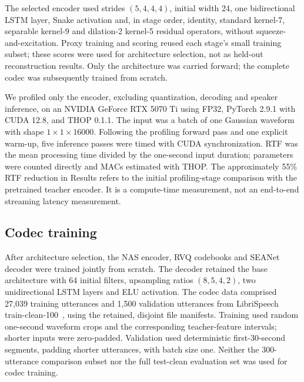 \documentclass[final,5p,times,twocolumn]{elsarticle}
\begin{document}
The selected encoder used strides $(5,4,4,4)$, initial width 24, one bidirectional LSTM layer, Snake activation and, in stage order, identity, standard kernel-7, separable kernel-9 and dilation-2 kernel-5 residual operators, without squeeze-and-excitation. Proxy training and scoring reused each stage's small training subset; these scores were used for architecture selection, not as held-out reconstruction results. Only the architecture was carried forward; the complete codec was subsequently trained from scratch.

We profiled only the encoder, excluding quantization, decoding and speaker inference, on an NVIDIA GeForce RTX 5070 Ti using FP32, PyTorch 2.9.1 with CUDA 12.8, and THOP 0.1.1. The input was a batch of one Gaussian waveform with shape $1\times1\times16000$. Following the profiling forward pass and one explicit warm-up, five inference passes were timed with CUDA synchronization. RTF was the mean processing time divided by the one-second input duration; parameters were counted directly and MACs estimated with THOP. The approximately 55\% RTF reduction in Results refers to the initial profiling-stage comparison with the pretrained teacher encoder. It is a compute-time measurement, not an end-to-end streaming latency measurement.

\subsection{Codec training}
After architecture selection, the NAS encoder, RVQ codebooks and SEANet decoder were trained jointly from scratch. The decoder retained the base architecture with 64 initial filters, upsampling ratios $(8,5,4,2)$, two unidirectional LSTM layers and ELU activation. The codec data comprised 27,039 training utterances and 1,500 validation utterances from LibriSpeech train-clean-100~\cite{librispeech}, using the retained, disjoint file manifests. Training used random one-second waveform crops and the corresponding teacher-feature intervals; shorter inputs were zero-padded. Validation used deterministic first-30-second segments, padding shorter utterances, with batch size one. Neither the 300-utterance comparison subset nor the full test-clean evaluation set was used for codec training.
\end{document}
